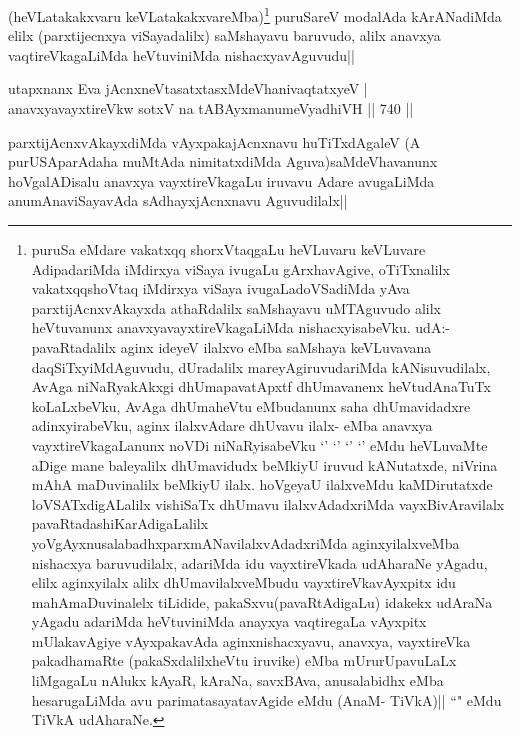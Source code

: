 \begin{artha}
(heVLatakakxvaru keVLatakakxvareMba)\footnote{puruSa eMdare vakatxqq shorxVtaqgaLu heVLuvaru keVLuvare AdipadariMda iMdirxya viSaya ivugaLu gArxhavAgive, oTiTxnalilx vakatxqqshoVtaq iMdirxya viSaya ivugaLadoVSadiMda yAva parxtijAcnxvAkayxda athaRdalilx saMshayavu uMTAguvudo alilx heVtuvanunx anavxyavayxtireVkagaLiMda nishacxyisabeVku. udA:- pavaRtadalilx aginx ideyeV ilalxvo eMba saMshaya keVLuvavana daqSiTxyiMdAguvudu, dUradalilx mareyAgiruvudariMda kANisuvudilalx, AvAga niNaRyakAkxgi dhUmapavatApxtf dhUmavanenx heVtudAnaTuTx koLaLxbeVku, AvAga dhUmaheVtu eMbudanunx saha dhUmavidadxre adinxyirabeVku, aginx ilalxvAdare dhUvavu ilalx- eMba anavxya vayxtireVkagaLanunx noVDi niNaRyisabeVku `\stext' `\stext' `\stext' `\stext' eMdu heVLuvaMte aDige mane baleyalilx dhUmavidudx beMkiyU iruvud kANutatxde, niVrina mAhA maDuvinalilx beMkiyU ilalx. hoVgeyaU ilalxveMdu kaMDirutatxde loVSATxdigALalilx vishiSaTx dhUmavu ilalxvAdadxriMda vayxBivAravilalx pavaRtadashiKarAdigaLalilx yoVgAyxnusalabadhxparxmANavilalxvAdadxriMda aginxyilalxveMba nishacxya baruvudilalx, adariMda idu vayxtireVkada udAharaNe yAgadu, elilx aginxyilalx alilx dhUmavilalxveMbudu vayxtireVkavAyxpitx idu mahAmaDuvinalelx tiLidide, pakaSxvu(pavaRtAdigaLu) idakekx udAraNa yAgadu adariMda heVtuviniMda anayxya vaqtiregaLa vAyxpitx mUlakavAgiye vAyxpakavAda aginxnishacxyavu, anavxya, vayxtireVka pakadhamaRte (pakaSxdalilxheVtu iruvike) eMba mUrurUpavuLaLx liMgagaLu nAlukx kAyaR, kAraNa, savxBAva, anusalabidhx eMba hesarugaLiMda avu parimatasayatavAgide eMdu (AnaM- TiVkA)|| ``\stext" eMdu TiVkA udAharaNe.} puruSareV modalAda kArANadiMda elilx (parxtijecnxya viSayadalilx) saMshayavu baruvudo, alilx anavxya vaqtireVkagaLiMda heVtuviniMda nishacxyavAguvudu||
\end{artha}

\begin{shl}
utapxnanx Eva jAcnxneV\s tasatxtasxMdeVhanivaqtatxyeV | \\
anavxyavayxtireVkw sotxV na tABAyxmanumeVyadhiVH \hfill||  740 ||  
\end{shl}

\begin{artha}
parxtijAcnxvAkayxdiMda vAyxpakajAcnxnavu huTiTxdAgaleV (A purUSAparAdaha muMtAda nimitatxdiMda Aguva)saMdeVhavanunx hoVgalADisalu anavxya vayxtireVkagaLu iruvavu Adare avugaLiMda anumAnaviSayavAda sAdhayxjAcnxnavu Aguvudilalx||
\end{artha}



